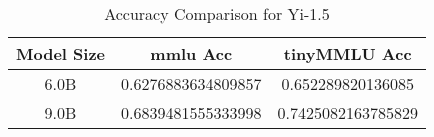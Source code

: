 \begin{table}[h!]
\centering
\begin{tabular}{|c|c|c|}
\hline
Model Size & mmlu Acc & tinyMMLU Acc \\ 
\hline
6.0B & 0.6276883634809857 & 0.652289820136085 \\ 
\hline
9.0B & 0.6839481555333998 & 0.7425082163785829 \\ 
\hline
\end{tabular}
\caption{Accuracy Comparison for Yi-1.5}
\end{table}

